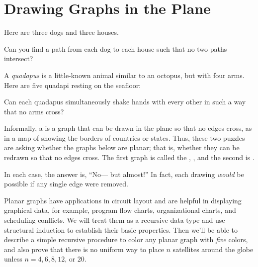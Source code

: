 \newcommand{\embed}[1]{\mathcal{#1}}  %


\section{Drawing Graphs in the Plane}

Here are three dogs and three houses.

\begin{center}

\end{center}

Can you find a path from each dog to each house such that no
two paths intersect?

A \emph{quadapus} is a little-known animal similar to an octopus,
but with four arms.  Here are five quadapi resting on the seafloor:


\begin{center}

\end{center}

Can each quadapus simultaneously shake hands with every other in such a
way that no arms cross?

Informally, a  is a graph that can be drawn in the
plane so that no edges cross, as in a map of showing the borders of
countries or states.  Thus, these two puzzles are asking whether the
graphs below are planar; that is, whether they can be redrawn so that no
edges cross.  The first graph is called the , , and the second is .

\begin{center}

\end{center}

In each case, the answer is, ``No--- but almost!''  In fact, each drawing
\emph{would} be possible if any single edge were removed.

Planar graphs have applications in circuit layout and are helpful in
displaying graphical data, for example, program flow charts, organizational
charts, and scheduling conflicts.  We will treat them as a recursive data
type and use structural induction to establish their basic properties.
Then we'll be able to describe a simple recursive procedure to color any
planar graph with \emph{five} colors, and also prove that there is no
uniform way to place $n$ satellites around the globe unless $n = 4,6,8,12$,
or $20$.

